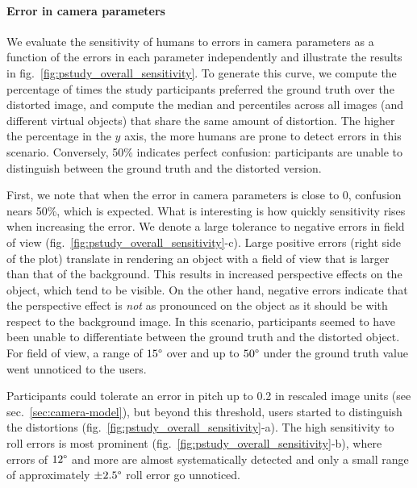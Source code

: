 \paragraph{Error in camera parameters} We evaluate the sensitivity of humans to errors in camera parameters as a function of the errors in each parameter independently and illustrate the results in fig.~\ref{fig:pstudy_overall_sensitivity}. To generate this curve, we compute the percentage of times the study participants preferred the ground truth over the distorted image, and compute the median and percentiles across all images (and different virtual objects) that share the same amount of distortion. The higher the percentage in the $y$ axis, the more humans are prone to detect errors in this scenario. Conversely, 50\% indicates perfect confusion: participants are unable to distinguish between the ground truth and the distorted version. 

First, we note that when the error in camera parameters is close to 0, confusion nears 50\%, which is expected. What is interesting is how quickly sensitivity rises when increasing the error. We denote a large tolerance to negative errors in field of view (fig.~\ref{fig:pstudy_overall_sensitivity}-c). Large positive errors (right side of the plot) translate in rendering an object with a field of view that is larger than that of the background. This results in increased perspective effects on the object, which tend to be visible. On the other hand, negative errors indicate that the perspective effect is \emph{not} as pronounced on the object as it should be with respect to the background image. In this scenario, participants seemed to have been unable to differentiate between the ground truth and the distorted object. For field of view, a range of $15\degree$ over and up to $50\degree$ under the ground truth value went unnoticed to the users.

Participants could tolerate an error in pitch up to 0.2 in rescaled image units (see sec.~\ref{sec:camera-model}), but beyond this threshold, users started to distinguish the distortions (fig.~\ref{fig:pstudy_overall_sensitivity}-a). The high sensitivity to roll errors is most prominent (fig.~\ref{fig:pstudy_overall_sensitivity}-b), where errors of $12\degree$ and more are almost systematically detected and only a small range of approximately $\pm2.5\degree$ roll error go unnoticed.


